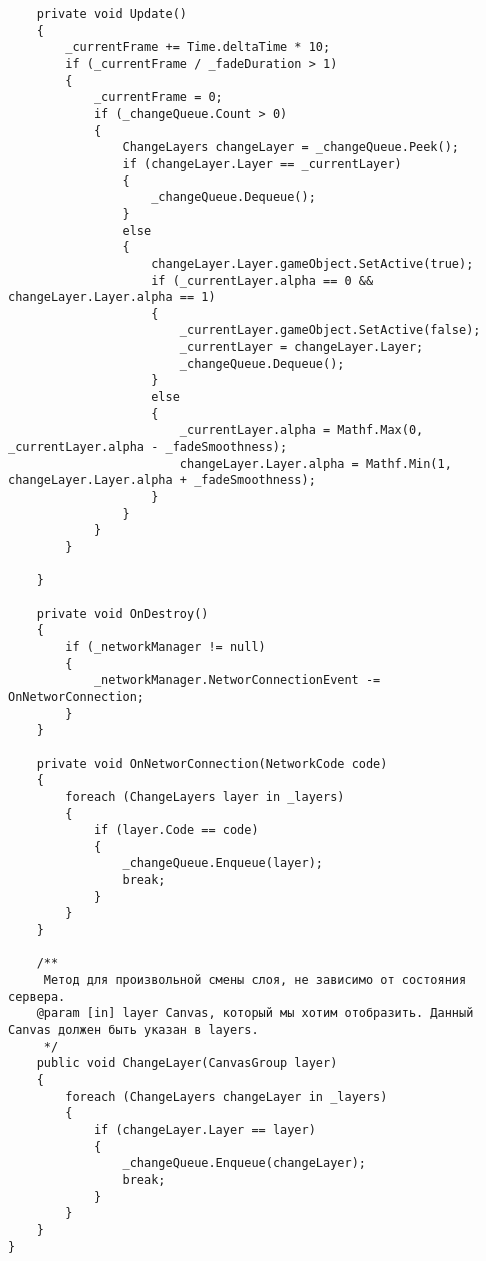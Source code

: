 \begin{verbatim}
    private void Update()
    {
        _currentFrame += Time.deltaTime * 10;
        if (_currentFrame / _fadeDuration > 1)
        {
            _currentFrame = 0;
            if (_changeQueue.Count > 0)
            {
                ChangeLayers changeLayer = _changeQueue.Peek();
                if (changeLayer.Layer == _currentLayer)
                {
                    _changeQueue.Dequeue();
                }
                else
                {
                    changeLayer.Layer.gameObject.SetActive(true);
                    if (_currentLayer.alpha == 0 && changeLayer.Layer.alpha == 1)
                    {
                        _currentLayer.gameObject.SetActive(false);
                        _currentLayer = changeLayer.Layer;
                        _changeQueue.Dequeue();
                    }
                    else
                    {
                        _currentLayer.alpha = Mathf.Max(0, _currentLayer.alpha - _fadeSmoothness);
                        changeLayer.Layer.alpha = Mathf.Min(1, changeLayer.Layer.alpha + _fadeSmoothness);
                    }
                }
            }
        }

    }

    private void OnDestroy()
    {
        if (_networkManager != null)
        {
            _networkManager.NetworConnectionEvent -= OnNetworConnection;
        }
    }

    private void OnNetworConnection(NetworkCode code)
    {
        foreach (ChangeLayers layer in _layers)
        {
            if (layer.Code == code)
            {
                _changeQueue.Enqueue(layer);
                break;
            }
        }
    }

    /**
     Метод для произвольной смены слоя, не зависимо от состояния сервера.
    @param [in] layer Canvas, который мы хотим отобразить. Данный Canvas должен быть указан в layers.
     */
    public void ChangeLayer(CanvasGroup layer)
    {
        foreach (ChangeLayers changeLayer in _layers)
        {
            if (changeLayer.Layer == layer)
            {
                _changeQueue.Enqueue(changeLayer);
                break;
            }
        }
    }
}

\end{verbatim}
